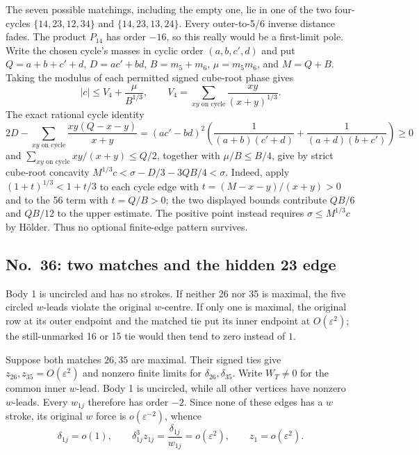\documentclass[11pt]{amsart}
\theoremstyle{remark}
\begin{document}
The seven possible matchings, including the empty one, lie in one of the two four-cycles $\{14,23,12,34\}$ and $\{14,23,13,24\}$. Every outer-to-5/6 inverse distance fades. The product $P_{14}$ has order $-16$, so this really would be a first-limit pole. Write the chosen cycle's masses in cyclic order $(a,b,c',d)$ and put $Q=a+b+c'+d$, $D=ac'+bd$, $B=m_5+m_6$, $\mu=m_5m_6$, and $M=Q+B$. Taking the modulus of each permitted signed cube-root phase gives
\[
|c|\le V_4+\frac{\mu}{B^{1/3}},\qquad
V_4=\sum_{xy\text{ on cycle}}\frac{xy}{(x+y)^{1/3}}.
\]
The exact rational cycle identity
\begin{equation}\label{eq:no84-cycle-deficit}
2D-\sum_{xy\text{ on cycle}}\frac{xy(Q-x-y)}{x+y}
=(ac'-bd)^2\left(\frac1{(a+b)(c'+d)}+\frac1{(a+d)(b+c')}\right)\ge0
\end{equation}
and $\sum_{xy\text{ on cycle}}xy/(x+y)\le Q/2$, together with $\mu/B\le B/4$, give by strict cube-root concavity $M^{1/3}c<\sigma-D/3-3QB/4<\sigma$. Indeed, apply $(1+t)^{1/3}<1+t/3$ to each cycle edge with $t=(M-x-y)/(x+y)>0$ and to the 56 term with $t=Q/B>0$; the two displayed bounds contribute $QB/6$ and $QB/12$ to the upper estimate. The positive point instead requires $\sigma\le M^{1/3}c$ by H\"older. Thus no optional finite-edge pattern survives.

\subsection{No.~36: two matches and the hidden 23 edge}\label{sec:no36-matches}
Body 1 is uncircled and has no strokes. If neither 26 nor 35 is maximal, the five circled $w$-leads violate the original $w$-centre. If only one is maximal, the original row at its outer endpoint and the matched tie put its inner endpoint at $O(\varepsilon^2)$; the still-unmarked 16 or 15 tie would then tend to zero instead of $1$.

Suppose both matches $26,35$ are maximal. Their signed ties give $z_{26},z_{35}=O(\varepsilon^2)$ and nonzero finite limits for $\delta_{26},\delta_{35}$. Write $W_T\ne0$ for the common inner $w$-lead. Body 1 is uncircled, while all other vertices have nonzero $w$-leads. Every $w_{1j}$ therefore has order $-2$. Since none of these edges has a $w$ stroke, its original $w$ force is $o(\varepsilon^{-2})$, whence
\[
 \delta_{1j}=o(1),\qquad
 \delta_{1j}^3z_{1j}=\frac{\delta_{1j}}{w_{1j}}
 =o(\varepsilon^2),\qquad z_1=o(\varepsilon^2).
\]
\end{document}
